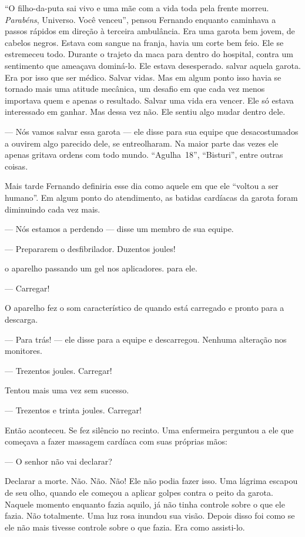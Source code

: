 ``O filho-da-puta sai vivo e uma mãe com a vida toda pela frente morreu. \emph{Parabéns}, Universo. Você venceu'', pensou Fernando enquanto caminhava a passos rápidos em direção à terceira ambulância. Era uma garota bem jovem, de cabelos negros. Estava com sangue na franja, havia um corte bem feio. Ele se estremeceu todo. Durante o trajeto da maca para dentro do hospital,  contra um sentimento que ameaçava dominá-lo. Ele estava desesperado.  salvar aquela garota. Era por isso que  ser médico. Salvar vidas. Mas em algum ponto isso havia se tornado mais uma atitude mecânica, um desafio em que cada vez menos importava quem e apenas o resultado. Salvar uma vida era vencer. Ele só estava interessado em ganhar. Mas dessa vez não. Ele sentiu algo mudar dentro dele.

--- Nós vamos salvar essa garota ---  ele disse para sua equipe que\mudanca{,} desacostumados a ouvirem algo parecido dele, se entreolharam. Na maior parte das vezes ele apenas gritava ordens com todo mundo. ``Agulha~18'', ``Bisturi'', entre outras coisas.

Mais tarde\mudanca{,} Fernando definiria esse dia como aquele em que ele ``voltou a ser humano''.  Em algum ponto do atendimento, as batidas cardíacas da garota foram diminuindo cada vez mais.

--- Nós estamos a perdendo --- disse um membro de sua equipe.

--- Prepararem o desfibrilador. Duzentos joules!

 o aparelho passando um gel nos aplicadores.  para ele.

--- Carregar!

O aparelho fez o som característico de quando está carregado e pronto para a descarga.

--- Para trás! --- ele disse para a equipe e descarregou. Nenhuma alteração nos monitores.

--- Trezentos joules. Carregar!

Tentou mais uma vez\mudanca{,} sem sucesso.

--- Trezentos e trinta joules. Carregar!

Então  aconteceu. Se fez silêncio no recinto. Uma enfermeira perguntou a ele\mudanca{,} que começava a fazer massagem cardíaca com suas próprias mãos:

--- O senhor não vai declarar?

Declarar a morte. Não. Não. Não! Ele não podia fazer isso. Uma lágrima escapou de seu olho, quando ele começou a aplicar golpes contra o peito da garota. Naquele momento\mudanca{,} enquanto fazia aquilo, já não tinha controle sobre o que ele fazia. Não totalmente. Uma luz rosa inundou sua visão. Depois disso foi como se ele não mais tivesse controle sobre o que fazia. Era como assisti-lo.

